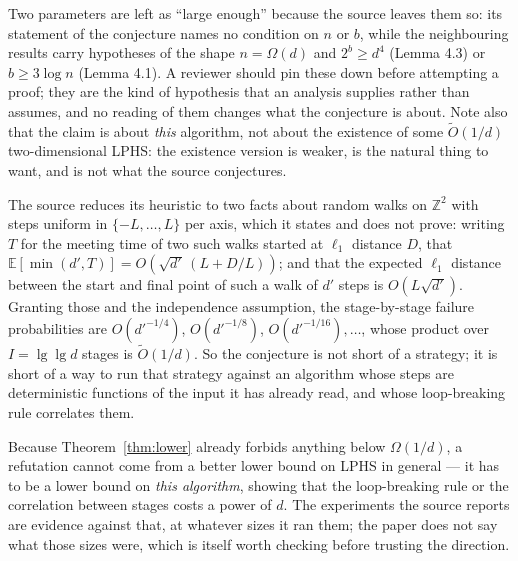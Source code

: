\documentclass{conjura-conjecture}
\newcommand{\Z}{\mathbb{Z}}
\newcommand{\Ot}{\widetilde{O}}
\newcommand{\Om}{\Omega}
\begin{document}
\begin{remark}
Two parameters are left as ``large enough'' because the source leaves
them so: its statement of the conjecture names no condition on $n$ or
$b$, while the neighbouring results carry hypotheses of the shape
$n = \Om(d)$ and $2^{b} \ge d^{4}$ (Lemma 4.3) or $b \ge 3\log n$
(Lemma 4.1). A reviewer should pin these down before attempting a
proof; they are the kind of hypothesis that an analysis supplies rather
than assumes, and no reading of them changes what the conjecture is
about. Note also that the claim is about \emph{this} algorithm, not
about the existence of some $\Ot(1/d)$ two-dimensional LPHS\@: the
existence version is weaker, is the natural thing to want, and is not
what the source conjectures.
\end{remark}

\begin{remark}
The source reduces its heuristic to two facts about random walks on
$\Z^{2}$ with steps uniform in $\{-L, \dots, L\}$ per axis, which it
states and does not prove: writing $T$ for the meeting
time of two such walks started at $\ell_{1}$ distance $D$, that
$\mathbb{E}[\min(d', T)] = O(\sqrt{d'}\,(L + D/L))$; and that the
expected $\ell_{1}$ distance between the start and final point of such
a walk of $d'$ steps is $O(L\sqrt{d'})$. Granting those and the
independence assumption, the stage-by-stage failure probabilities are
$O(d'^{-1/4})$, $O(d'^{-1/8})$, $O(d'^{-1/16}), \dots$, whose product
over $I = \lg\lg d$ stages is $\Ot(1/d)$. So the conjecture is not
short of a strategy; it is short of a way to run that strategy against
an algorithm whose steps are deterministic functions of the input it has
already read, and whose loop-breaking rule correlates them.
\end{remark}

\begin{remark}
Because Theorem~\ref{thm:lower} already forbids anything below
$\Om(1/d)$, a refutation cannot come from a better lower bound on LPHS
in general --- it has to be a lower bound on \emph{this algorithm},
showing that the loop-breaking rule or the correlation between stages
costs a power of $d$. The experiments the source reports are evidence
against that, at whatever sizes it ran them; the paper does not say what
those sizes were, which is itself worth checking before trusting the
direction.
\end{remark}
\end{document}
